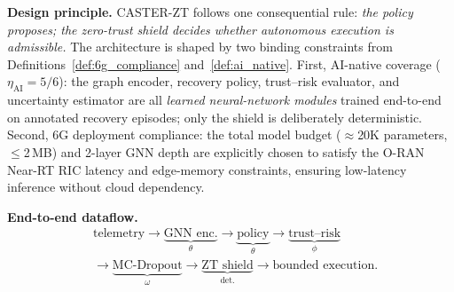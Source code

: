 \documentclass[10pt,journal,compsoc]{IEEEtran}
\begin{document}
\noindent\textbf{Design principle.}
CASTER-ZT follows one consequential rule: \emph{the policy proposes; the zero-trust shield decides whether autonomous execution is admissible.}
The architecture is shaped by two binding constraints from Definitions~\ref{def:6g_compliance} and~\ref{def:ai_native}.
First, AI-native coverage ($\eta_{\mathrm{AI}} = 5/6$): the graph encoder, recovery policy, trust--risk evaluator, and uncertainty estimator are all \emph{learned neural-network modules} trained end-to-end on annotated recovery episodes; only the shield is deliberately deterministic.
Second, 6G deployment compliance: the total model budget ($\approx$20K parameters, $\le$2\,MB) and 2-layer GNN depth are explicitly chosen to satisfy the O-RAN Near-RT RIC latency and edge-memory constraints, ensuring low-latency inference without cloud dependency.

\noindent\textbf{End-to-end dataflow.}
{\small
\begin{align*}
&\text{telemetry}\!\to\! \underbrace{\text{GNN enc.}}_{\theta}
\!\to\! \underbrace{\text{policy}}_{\theta}
\!\to\! \underbrace{\text{trust--risk}}_{\phi}\\
&\!\to\! \underbrace{\text{MC-Dropout}}_{\omega}
\!\to\! \underbrace{\text{ZT shield}}_{\text{det.}}
\!\to\! \text{bounded execution.}
\end{align*}
}
\end{document}
